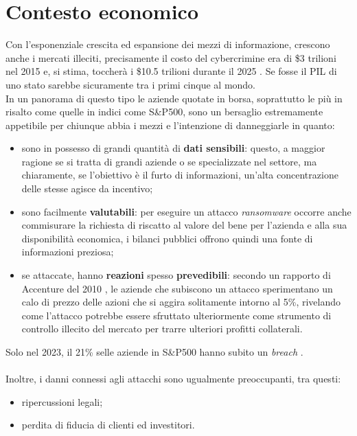 \documentclass[12pt,a4paper,twoside]{report}
\begin{document}
\section{Contesto economico}
Con l'esponenziale crescita ed espansione dei mezzi di informazione, crescono anche i mercati illeciti, precisamente il costo del cybercrimine era di \$3 trilioni nel 2015 e, si stima, toccher\`a i \$10.5 trilioni durante il 2025 \cite{cybercrime_magazine}. Se fosse il PIL di uno stato sarebbe sicuramente tra i primi cinque al mondo.\\
In un panorama di questo tipo le aziende quotate in borsa, soprattutto le pi\`u in risalto come quelle in indici come S\&P500, sono un bersaglio estremamente appetibile per chiunque abbia i mezzi e l'intenzione di danneggiarle in quanto:
\begin{itemize}
  \setlength{\itemsep}{0pt}
  \setlength{\parskip}{0pt}       
  \renewcommand{\labelitemi}{\textbf{--}} 
  \item sono in possesso di grandi quantit\`a di \textbf{dati sensibili}: questo, a maggior ragione se si tratta di grandi aziende o se specializzate nel settore, ma chiaramente, se l'obiettivo \`e il furto di informazioni, un'alta concentrazione delle stesse agisce da incentivo;
  \item sono facilmente \textbf{valutabili}: per eseguire un attacco \textit{ransomware} occorre anche commisurare la richiesta di riscatto al valore del bene per l'azienda e alla sua disponibilit\`a economica, i bilanci pubblici offrono quindi una fonte di informazioni  preziosa;
  \item se attaccate, hanno \textbf{reazioni} spesso \textbf{prevedibili}: secondo un rapporto di Accenture del 2010 \cite{accenture2010}, le aziende che subiscono un attacco sperimentano un calo di prezzo delle azioni che si aggira solitamente intorno al 5\%, rivelando come l'attacco potrebbe essere sfruttato ulteriormente come strumento di controllo illecito del mercato per trarre  ulteriori profitti collaterali.
\end{itemize}
Solo nel 2023, il 21\% selle aziende in S\&P500 hanno subito un \textit{breach} \cite{SecurityScorecard_SP500}.\\
\\
Inoltre, i danni connessi agli attacchi sono ugualmente preoccupanti, tra questi:
\begin{itemize}
  \setlength{\itemsep}{0pt}   
  \setlength{\parskip}{0pt}       
  \renewcommand{\labelitemi}{\textbf{--}}  
  \item ripercussioni legali;
  \item perdita di fiducia di clienti ed investitori.
\end{itemize}
\end{document}
